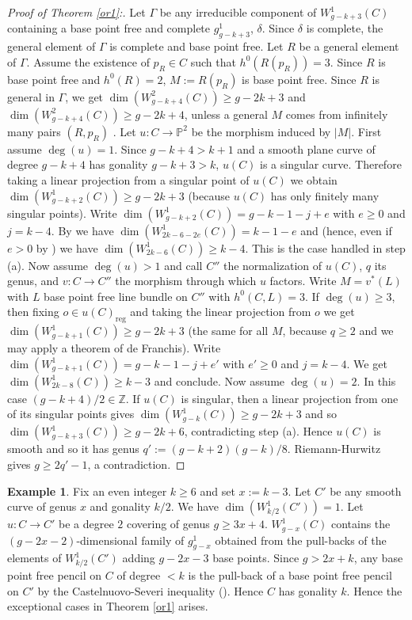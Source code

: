 \documentclass{amsart}
\theoremstyle{plain}
\theoremstyle{definition}
\newtheorem{example}{Example}
\begin{document}
\begin{proof}[Proof of Theorem \ref{or1}:]
Let $\Gamma$ be any irreducible component of $W^1_{g-k+3}({C})$ containing a base point free and complete $g^1_{g-k+3}$, $\delta$.
Since $\delta$ is complete, the general element of $\Gamma$ is complete and base point free. Let $R$ be a general element
of $\Gamma$. Assume the existence of $p_R\in C$ such that  $h^0(R(p_R)) =3$. Since $R$ is base point free and $h^0({R}) =2$, $M:= R(p_R)$ is base point free.
Since $R$ is general in $\Gamma$, we get $\dim (W^2_{g-k+4}({C})) \ge g-2k+3$
and $\dim (W^2_{g-k+4}({C})) \ge g-2k+4$, unless a general $M$ comes from infinitely many pairs $(R,p_R)$ .
 Let $u: C\to \mathbb {P}^2$ be the morphism induced by $|M|$. First assume
$\deg (u) =1$. Since $g-k+4 >k+1$
and a smooth plane curve of degree $g-k+4$ has gonality $g-k+3>k$,
$u({C})$ is a singular curve. Therefore taking a linear projection from a singular point of $u({C})$ we obtain $\dim (W^1_{g-k+2}({C})) \ge g-2k+3$ (because
$u({C})$ has only finitely many singular points). Write $\dim (W^1_{g-k+2}({C})) = g-k-1-j+e$ with $e\ge 0$ and $j =k-4$.
By \cite[Theorem 1]{h} we have $\dim (W^1_{2k-6-2e}({C})) = k-1-e$ and (hence, even if $e>0$ by \cite[Theorem 1]{fhl}) we have $\dim (W^1_{2k-6}({C})) \ge k-4$. This
is the case handled in step (a). Now assume $\deg (u) >1$ and call $C''$ the normalization of $u({C})$, $q$ its genus, and $v: C\to C''$
the morphism through which $u$ factors. Write $M = v^\ast (L)$ with $L$ base point free line bundle on $C''$ with $h^0(C,L) =3$. If $\deg (u)\ge 3$, then fixing $o\in u({C})_{\mathrm{reg}}$ and taking the linear
projection from $o$
we get $\dim (W^1_{g-k+1}({C})) \ge g-2k+3$ (the same for all $M$, because $q\ge 2$ and we may apply a theorem of de Franchis). Write $\dim (W^1_{g-k+1}({C})) = g-k-1-j+e'$ with $e'\ge 0$ and $j=k-4$. We get $\dim (W^1_{2k-8}({C})) \ge k-3$
and conclude. Now assume $\deg (u) =2$. In this case $(g-k+4)/2\in \mathbb {Z}$. If $u({C})$ is singular, then a linear projection from one of its singular points
gives $\dim (W^1_{g-k}({C}))\ge g-2k+3$ and so  $\dim (W^1_{g-k+3}({C}))\ge g-2k+6$, contradicting step (a).
Hence $u({C})$ is smooth and so it has genus $q':= (g-k+2)(g-k)/8$. Riemann-Hurwitz gives $g\ge 2q'-1$, a contradiction.\end{proof}


\begin{example}\label{or4}
Fix an even integer $k\ge 6$ and set $x:= k-3$. Let $C'$ be any smooth curve of genus $x$ and gonality $k/2$. We have $\dim (W^1_{k/2}(C')) =1$.
Let $u: C\to C'$ be a degree $2$ covering of genus $g \ge 3x+4$. $W^1_{g-x}({C})$ contains the $(g-2x-2)$-dimensional family of $g^1_{g-x}$ obtained from
the pull-backs of the elements of $W^1_{k/2}(C')$ adding $g-2x-3$ base points. Since $g > 2x+k$, any base point free pencil on $C$ of degree $ < k$
is the pull-back of a base point free pencil on $C'$ by the Castelnuovo-Severi inequality (\cite{k}). Hence $C$ has gonality $k$. Hence the exceptional cases
in Theorem \ref{or1} arises. \end{example}
\end{document}
